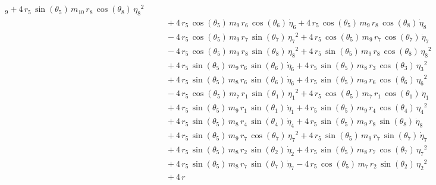 \begin{eqnarray*}
{_{9}} + 4\,r_{5}\,\sin({\theta_{5}})\,m_{10}\,r_{8}\,\cos({\theta_{8}}
)\,{{\eta_{8}}}^2 \\ &&\quad\mbox{} + 4\,r_{5}\,\cos({\theta_{5}})\,m
_{9}\,r_{6}\,\cos({\theta_{6}})\,{\dot{\eta}_{6}} + 4\,r_{5}\,\cos({
\theta_{5}})\,m_{9}\,r_{8}\,\cos({\theta_{8}})\,{\dot{\eta}_{8}}
 \\ &&\quad\mbox{} - 4\,r_{5}\,\cos({\theta_{5}})\,m_{9}\,r_{7}\,\sin(
{\theta_{7}})\,{{\eta_{7}}}^2 + 4\,r_{5}\,\cos({\theta_{5}})\,m_{9}\,r
_{7}\,\cos({\theta_{7}})\,{\dot{\eta}_{7}} \\ &&\quad\mbox{} - 4\,r_{5
}\,\cos({\theta_{5}})\,m_{9}\,r_{8}\,\sin({\theta_{8}})\,{{\eta_{8}}}^
2 + 4\,r_{5}\,\sin({\theta_{5}})\,m_{9}\,r_{8}\,\cos({\theta_{8}})\,{{
\eta_{8}}}^2 \\ &&\quad\mbox{} + 4\,r_{5}\,\sin({\theta_{5}})\,m_{9}\,
r_{6}\,\sin({\theta_{6}})\,{\dot{\eta}_{6}} + 4\,r_{5}\,\sin({\theta_{
5}})\,m_{8}\,r_{3}\,\cos({\theta_{3}})\,{{\eta_{3}}}^2
 \\ &&\quad\mbox{} + 4\,r_{5}\,\sin({\theta_{5}})\,m_{8}\,r_{6}\,\sin(
{\theta_{6}})\,{\dot{\eta}_{6}} + 4\,r_{5}\,\sin({\theta_{5}})\,m_{9}
\,r_{6}\,\cos({\theta_{6}})\,{{\eta_{6}}}^2 \\ &&\quad\mbox{} - 4\,r_{
5}\,\cos({\theta_{5}})\,m_{7}\,r_{1}\,\sin({\theta_{1}})\,{{\eta_{1}}}
^2 + 4\,r_{5}\,\cos({\theta_{5}})\,m_{7}\,r_{1}\,\cos({\theta_{1}})\,{
\dot{\eta}_{1}} \\ &&\quad\mbox{} + 4\,r_{5}\,\sin({\theta_{5}})\,m_{9
}\,r_{1}\,\sin({\theta_{1}})\,{\dot{\eta}_{1}} + 4\,r_{5}\,\sin({
\theta_{5}})\,m_{9}\,r_{4}\,\cos({\theta_{4}})\,{{\eta_{4}}}^2
 \\ &&\quad\mbox{} + 4\,r_{5}\,\sin({\theta_{5}})\,m_{8}\,r_{4}\,\sin(
{\theta_{4}})\,{\dot{\eta}_{4}} + 4\,r_{5}\,\sin({\theta_{5}})\,m_{9}
\,r_{8}\,\sin({\theta_{8}})\,{\dot{\eta}_{8}} \\ &&\quad\mbox{} + 4\,r
_{5}\,\sin({\theta_{5}})\,m_{9}\,r_{7}\,\cos({\theta_{7}})\,{{\eta_{7}
}}^2 + 4\,r_{5}\,\sin({\theta_{5}})\,m_{9}\,r_{7}\,\sin({\theta_{7}})
\,{\dot{\eta}_{7}} \\ &&\quad\mbox{} + 4\,r_{5}\,\sin({\theta_{5}})\,m
_{8}\,r_{2}\,\sin({\theta_{2}})\,{\dot{\eta}_{2}} + 4\,r_{5}\,\sin({
\theta_{5}})\,m_{8}\,r_{7}\,\cos({\theta_{7}})\,{{\eta_{7}}}^2
 \\ &&\quad\mbox{} + 4\,r_{5}\,\sin({\theta_{5}})\,m_{8}\,r_{7}\,\sin(
{\theta_{7}})\,{\dot{\eta}_{7}} - 4\,r_{5}\,\cos({\theta_{5}})\,m_{7}
\,r_{2}\,\sin({\theta_{2}})\,{{\eta_{2}}}^2 \\ &&\quad\mbox{} + 4\,r_{
}
\end{eqnarray*}
